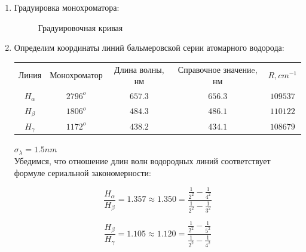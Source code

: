 \documentclass[12pt,a4paper]{article}
\begin{document}
\begin{enumerate}
\item Градуировка монохроматора:

\begin{figure}[ht!]\label{grade} 
\caption{Градуировочная кривая}
\end{figure}

\item Определим координаты линий бальмеровской серии атомарного водорода:


\begin{center}
\begin{tabular}{ccccc}
Линия & Монохроматор & Длина волны, нм & Справочное значениe, нм & $R, cm^{-1}$\\
$H_\alpha$ & $2796^o$ & $ 657.3 $ & $ 656.3 $ & $109537$ \\
$H_\beta$ & $1806^o$ & $ 484.3 $ & $ 486.1$ & $110122$ \\
$H_\gamma$ & $1172^o$ & $438.2 $ & $ 434.1$ & $108679$ \\
\end{tabular}
\end{center}
$\sigma_\lambda = 1.5 nm$ \\
Убедимся, что отношение длин волн водородных линий соответствует формуле сериальной закономерности:

\begin{minipage}{0.49\textwidth}
\begin{equation*}
\frac{H_\alpha}{H_\beta} = 1.357 \approx 1.350 = \frac{\frac{1}{2^2}-\frac{1}{4^2}}{\frac{1}{2^2}-\frac{1}{3^2}}
\end{equation*}
\end{minipage}
\begin{minipage}{0.49\textwidth}
\begin{equation*}
\frac{H_\beta}{H_\gamma} = 1.105 \approx 1.120 = \frac{\frac{1}{2^2}-\frac{1}{5^2}}{\frac{1}{2^2}-\frac{1}{4^2}}
\end{equation*}
\end{minipage}



\end{enumerate}
\end{document}
